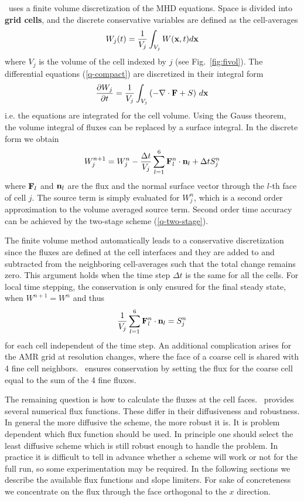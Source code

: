 \BATSRUS\ uses a finite volume discretization of the MHD equations.
Space is divided into {\bf grid cells}, and the discrete conservative
variables are defined as the cell-averages 
\begin{equation}
   W_j(t) = \frac{1}{V_j}\int_{V_j} W(\mathbf x,t) d\mathbf x
\label{q-average}
\end{equation}
where $V_j$ is the volume of the cell indexed by $j$ (see Fig.~\ref{fig:fivol}).
The differential equations (\ref{q-compact}) are discretized in their 
integral form
\begin{equation}
   \frac{\partial W_j}{\partial t}=
     \frac{1}{V_j}\int_{V_j}\left(-\nabla\cdot \mathbf F + S\right)\,d\mathbf x
\label{q-integral}
\end{equation}
i.e. the equations are integrated for the cell volume. Using the Gauss
theorem, the volume integral of fluxes can be replaced by a surface integral.
In the discrete form we obtain
\begin{equation}
   W^{n+1}_j=W^n_j 
      -\frac{\Delta t}{V_j}\sum_{l=1}^{6}\mathbf F^n_l\cdot\mathbf n_l + \Delta t S_j^n
\label{q-fivol}
\end{equation}
where $\mathbf F_l$ and $\mathbf n_l$ are the flux and the normal surface vector
through the $l$-th face of cell $j$. The source term is simply evaluated
for $W_j^n$, which is a second order approximation to the volume averaged
source term. Second order time accuracy can be achieved by 
the two-stage scheme (\ref{q-two-stage}). 

The finite volume method automatically leads to a conservative 
discretization since the fluxes are defined at the cell interfaces and
they are added to and subtracted from the neighboring cell-averages
such that the total change remains zero. This argument holds when the
time step $\Delta t$ is the same for all the cells. 
For local time stepping, the conservation
is only ensured for the final steady state, when $W^{n+1}=W^n$ and thus
\begin{equation}
   \frac{1}{V_j}\sum_{l=1}^{6}\mathbf F^n_l\cdot\mathbf n_l = S_j^n
\label{q-fivol-steady}
\end{equation}
for each cell independent of the time step. An additional complication
arises for the AMR grid at resolution changes, where the face of a coarse cell
is shared with 4 fine cell neighbors. \BATSRUS\ ensures conservation 
by setting the flux for the coarse cell equal to the sum of the 4 fine fluxes.

The remaining question is how to calculate the fluxes at the cell faces.
\BATSRUS\ provides several numerical flux functions. These differ in their
diffusiveness and robustness. In general the more diffusive the scheme, 
the more robust it is. It is problem dependent which flux function should
be used. In principle one should select the least diffusive scheme which
is still robust enough to handle the problem. In practice it is difficult
to tell in advance whether a scheme will work or not for the full run,
so some experimentation may be required. In the following sections
we describe the available flux functions and slope limiters. 
For sake of concreteness we concentrate on the flux through the face
orthogonal to the $x$ direction.

